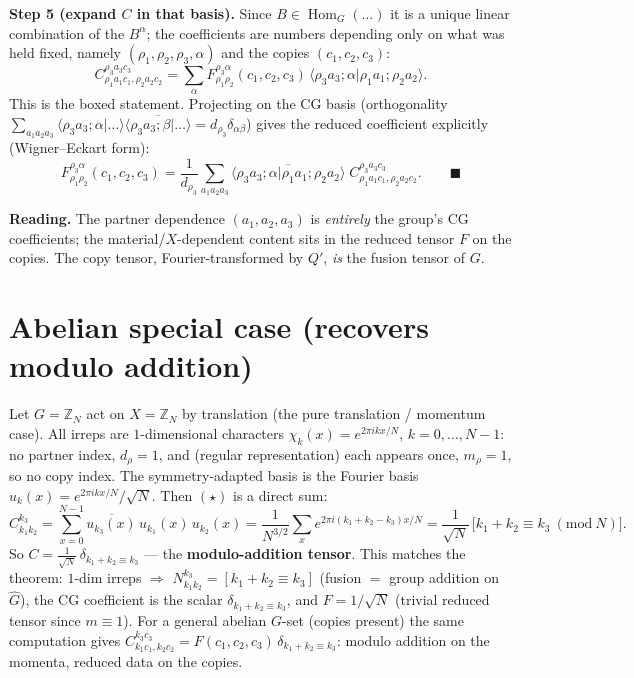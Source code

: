 \documentclass[11pt]{article}
\newcommand{\Hom}{\operatorname{Hom}}\newcommand{\C}{\mathbb C}
\theoremstyle{plain}\newtheorem*{thm}{Theorem}\newtheorem*{lem}{Lemma}
\begin{document}
\textbf{Step 5 (expand $C$ in that basis).} Since $B\in\Hom_G(\dots)$ it is a unique linear combination
of the $B^\alpha$; the coefficients are numbers depending only on what was held fixed, namely
$(\rho_1,\rho_2,\rho_3,\alpha)$ and the copies $(c_1,c_2,c_3)$:
\[
   C^{\rho_3 a_3 c_3}_{\rho_1 a_1 c_1,\rho_2 a_2 c_2}
   =\sum_{\alpha}F^{\rho_3\alpha}_{\rho_1\rho_2}(c_1,c_2,c_3)\,
   \langle\rho_3 a_3;\alpha|\rho_1 a_1;\rho_2 a_2\rangle .
\]
This is the boxed statement. Projecting on the CG basis (orthogonality
$\sum_{a_1a_2a_3}\langle\rho_3a_3;\alpha|\dots\rangle\overline{\langle\rho_3a_3;\beta|\dots\rangle}=d_{\rho_3}\delta_{\alpha\beta}$)
gives the reduced coefficient explicitly (Wigner--Eckart form):
\[
   F^{\rho_3\alpha}_{\rho_1\rho_2}(c_1,c_2,c_3)
   =\frac1{d_{\rho_3}}\sum_{a_1a_2a_3}
   \overline{\langle\rho_3 a_3;\alpha|\rho_1 a_1;\rho_2 a_2\rangle}\;
   C^{\rho_3 a_3 c_3}_{\rho_1 a_1 c_1,\rho_2 a_2 c_2}.\qquad\blacksquare
\]

\textbf{Reading.} The partner dependence $(a_1,a_2,a_3)$ is \emph{entirely} the group's CG coefficients;
the material/$X$-dependent content sits in the reduced tensor $F$ on the copies. The copy tensor,
Fourier-transformed by $Q'$, \emph{is} the fusion tensor of $G$.

\section{Abelian special case (recovers modulo addition)}
Let $G=\mathbb Z_N$ act on $X=\mathbb Z_N$ by translation (the pure translation / momentum case).
All irreps are $1$-dimensional characters $\chi_k(x)=e^{2\pi i k x/N}$, $k=0,\dots,N-1$: no partner
index, $d_\rho=1$, and (regular representation) each appears once, $m_\rho=1$, so no copy index. The
symmetry-adapted basis is the Fourier basis $u_k(x)=e^{2\pi i kx/N}/\sqrt N$. Then $(\star)$ is a direct
sum:
\[
   C^{k_3}_{k_1 k_2}=\sum_{x=0}^{N-1}\overline{u_{k_3}(x)}\,u_{k_1}(x)\,u_{k_2}(x)
   =\frac1{N^{3/2}}\sum_{x}e^{2\pi i(k_1+k_2-k_3)x/N}
   =\frac1{\sqrt N}\,\big[k_1+k_2\equiv k_3\ (\mathrm{mod}\ N)\big].
\]
So $C=\tfrac1{\sqrt N}\,\delta_{k_1+k_2\equiv k_3}$ --- the \textbf{modulo-addition tensor}. This matches
the theorem: $1$-dim irreps $\Rightarrow$ $N^{k_3}_{k_1 k_2}=[k_1{+}k_2\equiv k_3]$ (fusion $=$ group
addition on $\widehat G$), the CG coefficient is the scalar $\delta_{k_1+k_2\equiv k_3}$, and
$F=1/\sqrt N$ (trivial reduced tensor since $m\equiv1$). For a general abelian $G$-set (copies present)
the same computation gives $C^{k_3 c_3}_{k_1 c_1,k_2 c_2}=F(c_1,c_2,c_3)\,\delta_{k_1+k_2\equiv k_3}$:
modulo addition on the momenta, reduced data on the copies.
\end{document}
